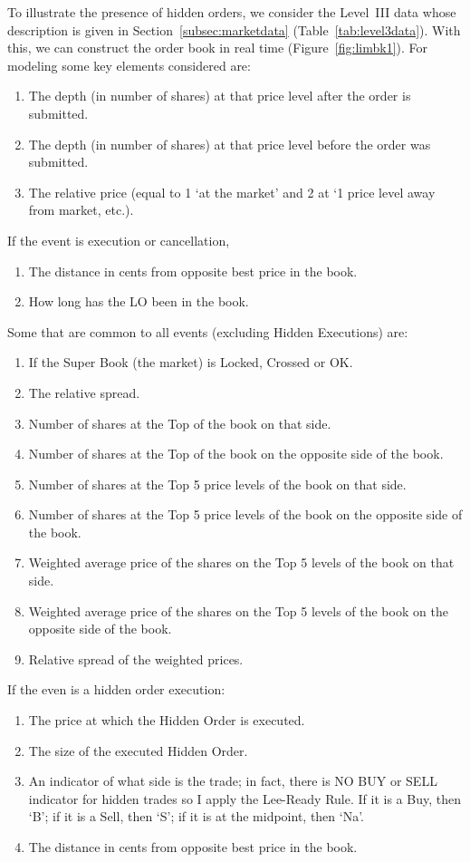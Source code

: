 To illustrate the presence of hidden orders, we consider the Level~III data whose description is given in Section~\ref{subsec:marketdata} (Table~\ref{tab:level3data}). With this, we can construct the order book in real time (Figure~\ref{fig:limbk1}). For modeling some key elements considered are:
        \begin{enumerate}[--]
        \item The depth (in number of shares) at that price level after the order is submitted.
        \item The depth (in number of shares) at that price level before the order was submitted.
        \item The relative price (equal to 1 `at the market' and 2 at `1 price level away from market, etc.). 
        \end{enumerate}
        If the event is execution or cancellation,
        \begin{enumerate}[--]
        \item The distance in cents from opposite best price in the book.
        \item How long has the LO been in the book.
        \end{enumerate}
        Some that are common to all events (excluding Hidden Executions) are:
        \begin{enumerate}[--]
        \item If the Super Book (the market) is Locked, Crossed or OK.
        \item The relative spread.
        \item Number of shares at the Top of the book on that side.
        \item Number of shares at the Top of the book on the opposite side of the book.
        \item Number of shares at the Top 5 price levels of the book on that side.
        \item Number of shares at the Top 5 price levels of the book on the opposite side of the book.
        \item Weighted average price of the shares on the Top 5 levels of the book on that side.
        \item Weighted average price of the shares on the Top 5 levels of the book on the opposite side of the book.
        \item Relative spread of the weighted prices.
        \end{enumerate}
If the even is a hidden order execution:
        \begin{enumerate}[--]
        \item The price at which the Hidden Order is executed.
        \item The size of the executed Hidden Order.
        \item An indicator of what side is the trade; in fact, there is NO BUY or SELL indicator for hidden trades so I apply the Lee-Ready Rule. If it is a Buy, then `B'; if it is a Sell, then `S'; if it is at the midpoint, then `Na'.
        \item The distance in cents from opposite best price in the book.
        \end{enumerate}


